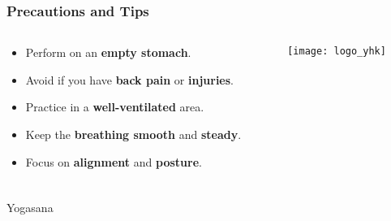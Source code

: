 \begin{frame}[fragile]\frametitle{Precautions and Tips}
\begin{columns}
    \begin{column}[T]{0.5\linewidth}
      \begin{itemize}
        \item Perform on an \textbf{empty stomach}.
        \item Avoid if you have \textbf{back pain} or \textbf{injuries}.
        \item Practice in a \textbf{well-ventilated} area.
        \item Keep the \textbf{breathing smooth} and \textbf{steady}.
        \item Focus on \textbf{alignment} and \textbf{posture}.
      \end{itemize}
    \end{column}
    \begin{column}[T]{0.5\linewidth}
        \begin{center}
        \texttt{[image: logo\_yhk]}
        \end{center}	
    \end{column}
\end{columns}
\end{frame}


\begin{frame}[fragile]\frametitle{}
\begin{center}
{\Large Yogasana}
\end{center}
\end{frame}

